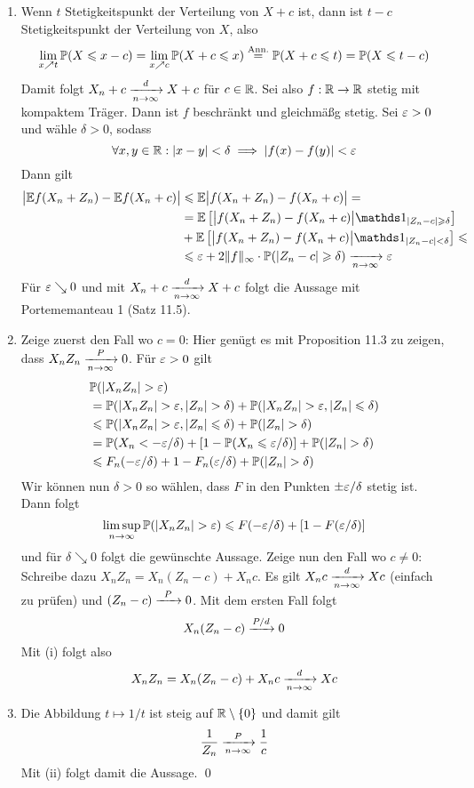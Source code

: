 \begin{enumerate}[label=(\roman*)]
    \item Wenn $t$ Stetigkeitspunkt der Verteilung von $X+c$ ist, dann ist $t-c$ Stetigkeitspunkt der Verteilung von $X$, also 
    $$\lim_{x\nearrow t}\mathbb{P}(X\leqslant x-c)=\lim_{x\nearrow c}\mathbb{P}(X+c\leqslant x)\overset{\text{Ann.}}{=}\mathbb{P}(X+c\leqslant t)=\mathbb{P}(X\leqslant t-c)$$
    Damit folgt $X_n+c\nto{d}{n\to\infty}X+c$ f\"ur $c\in\mathbb{R}$. \newline
    Sei also $f:\mathbb{R}\to\mathbb{R}$ stetig mit kompaktem Tr\"ager. Dann ist $f$ beschr\"ankt und gleichm\"a\ss{}g stetig. Sei $\varepsilon>0$ und w\"ahle $\delta>0$, sodass
    $$\forall x,y\in\mathbb{R}:|x-y|<\delta\implies|f(x)-f(y)|<\varepsilon$$
    Dann gilt
    \begin{align*}
        \big|\E f(X_n+Z_n)-\E f(X_n+c)\big|&\leq\E\big|f(X_n+Z_n)-f(X_n+c)\big|=\\
        &=\E\left[\big|f(X_n+Z_n)-f(X_n+c)\big|\ind{|Z_n-c|\geq\delta}\right]\\&+\E\left[\big|f(X_n+Z_n)-f(X_n+c)\big|\ind{|Z_n-c|<\delta}\right]\leq\\
        &\leq\eps+2\Vert f\Vert_\infty\cdot\Pp(|Z_n-c|\geq\delta)\nto{}{n\to\infty}\eps
    \end{align*}
    F\"ur $\varepsilon\searrow 0$ und mit $X_n+c\nto{d}{n\to\infty}X+c$ folgt die Aussage mit Portememanteau 1 (Satz 11.5).
    \item Zeige zuerst den Fall wo $c=0$: \newline 
    Hier gen\"ugt es mit Proposition 11.3 zu zeigen, dass $X_nZ_n\nto{P}{n\to\infty}0$. F\"ur $\varepsilon>0$ gilt
    \begin{align*}
        &\Pp(|X_nZ_n|>\eps)\\
        &=\Pp(|X_nZ_n|>\eps,|Z_n|>\delta)+\Pp(|X_nZ_n|>\eps,|Z_n|\leq\delta)\\
        &\leq\Pp(|X_nZ_n|>\eps,|Z_n|\leq\delta)+\Pp(|Z_n|>\delta)\\
        &=\Pp(X_n<-\eps/\delta)+[1-\Pp(X_n\leq\eps/\delta)]+\Pp(|Z_n|>\delta) \\
        &\leq F_n(-\eps/\delta)+1-F_n(\eps/\delta)+\Pp(|Z_n|>\delta)
    \end{align*}
    Wir k\"onnen nun $\delta>0$ so w\"ahlen, dass $F$ in den Punkten $\pm\varepsilon/\delta$ stetig ist. Dann folgt
    $$\limsup_{n\to\infty}\Pp(|X_nZ_n|>\eps)\leq F(-\eps/\delta)+[1-F(\eps/\delta)]$$
    und f\"ur $\delta\searrow0$ folgt die gew\"unschte Aussage.\newline
    Zeige nun den Fall wo $c\neq0$: \newline
    Schreibe dazu $X_nZ_n=X_n(Z_n-c)+X_nc$. Es gilt $X_nc\nto{d}{n\to\infty}Xc$ (einfach zu pr\"ufen) und $(Z_n-c)\nto{P}{}0$. Mit dem ersten Fall folgt
    $$X_n(Z_n-c)\nto{P/d}{}0$$
    Mit (i) folgt also 
    $$X_nZ_n=X_n(Z_n-c)+X_nc\nto{d}{n\to\infty}Xc$$
    \item Die Abbildung $t\mapsto 1/t$ ist steig auf $\mathbb{R}\setminus \{0\}$ und damit gilt 
    $$\frac{1}{Z_n}\nto{P}{n\to\infty}\frac{1}{c}$$
    Mit (ii) folgt damit die Aussage. \qed
\end{enumerate}

